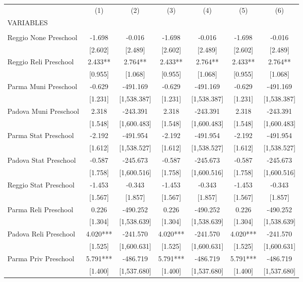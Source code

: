 \begin{tabular}{lcccccc} \hline
 & (1) & (2) & (3) & (4) & (5) & (6) \\
VARIABLES &  &  &  &  &  &  \\ \hline
 &  &  &  &  &  &  \\
Reggio None Preschool & -1.698 & -0.016 & -1.698 & -0.016 & -1.698 & -0.016 \\
 & [2.602] & [2.489] & [2.602] & [2.489] & [2.602] & [2.489] \\
Reggio Reli Preschool & 2.433** & 2.764** & 2.433** & 2.764** & 2.433** & 2.764** \\
 & [0.955] & [1.068] & [0.955] & [1.068] & [0.955] & [1.068] \\
Parma Muni Preschool & -0.629 & -491.169 & -0.629 & -491.169 & -0.629 & -491.169 \\
 & [1.231] & [1,538.387] & [1.231] & [1,538.387] & [1.231] & [1,538.387] \\
Padova Muni Preschool & 2.318 & -243.391 & 2.318 & -243.391 & 2.318 & -243.391 \\
 & [1.548] & [1,600.483] & [1.548] & [1,600.483] & [1.548] & [1,600.483] \\
Parma Stat Preschool & -2.192 & -491.954 & -2.192 & -491.954 & -2.192 & -491.954 \\
 & [1.612] & [1,538.527] & [1.612] & [1,538.527] & [1.612] & [1,538.527] \\
Padova Stat Preschool & -0.587 & -245.673 & -0.587 & -245.673 & -0.587 & -245.673 \\
 & [1.758] & [1,600.516] & [1.758] & [1,600.516] & [1.758] & [1,600.516] \\
Reggio Stat Preschool & -1.453 & -0.343 & -1.453 & -0.343 & -1.453 & -0.343 \\
 & [1.567] & [1.857] & [1.567] & [1.857] & [1.567] & [1.857] \\
Parma Reli Preschool & 0.226 & -490.252 & 0.226 & -490.252 & 0.226 & -490.252 \\
 & [1.304] & [1,538.639] & [1.304] & [1,538.639] & [1.304] & [1,538.639] \\
Padova Reli Preschool & 4.020*** & -241.570 & 4.020*** & -241.570 & 4.020*** & -241.570 \\
 & [1.525] & [1,600.631] & [1.525] & [1,600.631] & [1.525] & [1,600.631] \\
Parma Priv Preschool & 5.791*** & -486.719 & 5.791*** & -486.719 & 5.791*** & -486.719 \\
 & [1.400] & [1,537.680] & [1.400] & [1,537.680] & [1.400] & [1,537.680] \\

\end{tabular}
